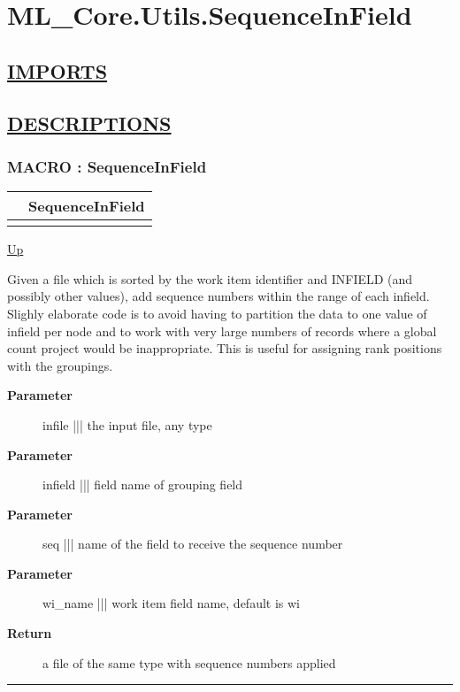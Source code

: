 \chapter*{ML\_Core.Utils.SequenceInField}
\hypertarget{ecldoc:toc:ML_Core.Utils.SequenceInField}{}

\section*{\underline{IMPORTS}}

\section*{\underline{DESCRIPTIONS}}
\subsection*{MACRO : SequenceInField}
\hypertarget{ecldoc:ml_core.utils.sequenceinfield}{}

{\renewcommand{\arraystretch}{1.5}
\begin{tabularx}{\textwidth}{|>{\raggedright\arraybackslash}l|X|}
\hline
\hspace{0pt} & SequenceInField \\
\hline
\multicolumn{2}{|>{\raggedright\arraybackslash}X|}{\hspace{0pt}(infile,infield,seq,wi\_name='wi')} \\
\hline
\end{tabularx}
}

\hyperlink{ecldoc:toc:ML_Core/Utils}{Up}

\par
Given a file which is sorted by the work item identifier and INFIELD (and possibly other values), add sequence numbers within the range of each infield. Slighly elaborate code is to avoid having to partition the data to one value of infield per node and to work with very large numbers of records where a global count project would be inappropriate. This is useful for assigning rank positions with the groupings.

\par
\begin{description}
\item [\textbf{Parameter}] infile ||| the input file, any type
\item [\textbf{Parameter}] infield ||| field name of grouping field
\item [\textbf{Parameter}] seq ||| name of the field to receive the sequence number
\item [\textbf{Parameter}] wi\_name ||| work item field name, default is wi
\item [\textbf{Return}] a file of the same type with sequence numbers applied
\end{description}

\rule{\textwidth}{0.4pt}
